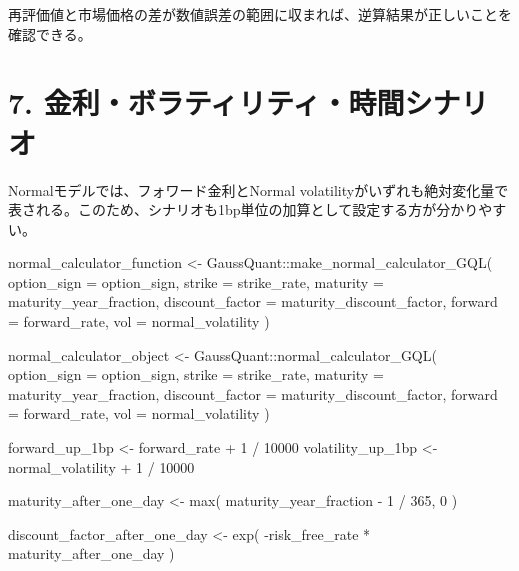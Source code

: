 \documentclass[
  letterpaper,
  DIV=11,
  numbers=noendperiod]{scrreprt}
\newenvironment{Shaded}{\begin{snugshade}}{\end{snugshade}}
\newcommand{\AttributeTok}[1]{\textcolor[rgb]{0.40,0.45,0.13}{#1}}
\newcommand{\DecValTok}[1]{\textcolor[rgb]{0.68,0.00,0.00}{#1}}
\newcommand{\FunctionTok}[1]{\textcolor[rgb]{0.28,0.35,0.67}{#1}}
\newcommand{\NormalTok}[1]{\textcolor[rgb]{0.00,0.23,0.31}{#1}}
\newcommand{\OtherTok}[1]{\textcolor[rgb]{0.00,0.23,0.31}{#1}}
\newcommand{\SpecialCharTok}[1]{\textcolor[rgb]{0.37,0.37,0.37}{#1}}
\begin{document}
再評価値と市場価格の差が数値誤差の範囲に収まれば、逆算結果が正しいことを確認できる。

\section{7.
金利・ボラティリティ・時間シナリオ}\label{ux91d1ux5229ux30dcux30e9ux30c6ux30a3ux30eaux30c6ux30a3ux6642ux9593ux30b7ux30caux30eaux30aa}

Normalモデルでは、フォワード金利とNormal
volatilityがいずれも絶対変化量で表される。このため、シナリオも1bp単位の加算として設定する方が分かりやすい。

\begin{Shaded}
\begin{Highlighting}[]
\NormalTok{normal\_calculator\_function }\OtherTok{\textless{}{-}}\NormalTok{ GaussQuant}\SpecialCharTok{::}\FunctionTok{make\_normal\_calculator\_GQL}\NormalTok{(}
  \AttributeTok{option\_sign =}\NormalTok{ option\_sign,}
  \AttributeTok{strike =}\NormalTok{ strike\_rate,}
  \AttributeTok{maturity =}\NormalTok{ maturity\_year\_fraction,}
  \AttributeTok{discount\_factor =}\NormalTok{ maturity\_discount\_factor,}
  \AttributeTok{forward =}\NormalTok{ forward\_rate,}
  \AttributeTok{vol =}\NormalTok{ normal\_volatility}
\NormalTok{)}

\NormalTok{normal\_calculator\_object }\OtherTok{\textless{}{-}}\NormalTok{ GaussQuant}\SpecialCharTok{::}\FunctionTok{normal\_calculator\_GQL}\NormalTok{(}
  \AttributeTok{option\_sign =}\NormalTok{ option\_sign,}
  \AttributeTok{strike =}\NormalTok{ strike\_rate,}
  \AttributeTok{maturity =}\NormalTok{ maturity\_year\_fraction,}
  \AttributeTok{discount\_factor =}\NormalTok{ maturity\_discount\_factor,}
  \AttributeTok{forward =}\NormalTok{ forward\_rate,}
  \AttributeTok{vol =}\NormalTok{ normal\_volatility}
\NormalTok{)}

\NormalTok{forward\_up\_1bp }\OtherTok{\textless{}{-}}\NormalTok{ forward\_rate }\SpecialCharTok{+} \DecValTok{1} \SpecialCharTok{/} \DecValTok{10000}
\NormalTok{volatility\_up\_1bp }\OtherTok{\textless{}{-}}\NormalTok{ normal\_volatility }\SpecialCharTok{+} \DecValTok{1} \SpecialCharTok{/} \DecValTok{10000}

\NormalTok{maturity\_after\_one\_day }\OtherTok{\textless{}{-}} \FunctionTok{max}\NormalTok{(}
\NormalTok{  maturity\_year\_fraction }\SpecialCharTok{{-}} \DecValTok{1} \SpecialCharTok{/} \DecValTok{365}\NormalTok{,}
  \DecValTok{0}
\NormalTok{)}

\NormalTok{discount\_factor\_after\_one\_day }\OtherTok{\textless{}{-}} \FunctionTok{exp}\NormalTok{(}
  \SpecialCharTok{{-}}\NormalTok{risk\_free\_rate }\SpecialCharTok{*}\NormalTok{ maturity\_after\_one\_day}
\NormalTok{)}


\end{Highlighting}
\end{Shaded}
\end{document}
